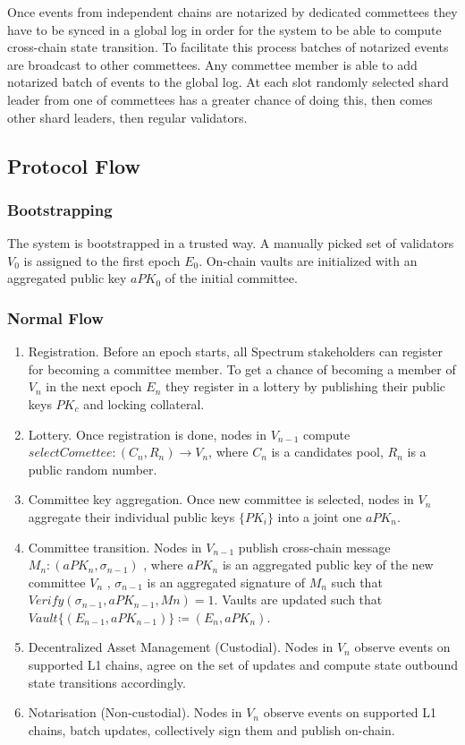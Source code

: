 Once events from independent chains are notarized by dedicated commettees they have to be synced in a global log in order for the system to be able to compute cross-chain state transition.
To facilitate this process batches of notarized events are broadcast to other commettees.
Any commettee member is able to add notarized batch of events to the global log.
At each slot randomly selected shard leader from one of commettees has a greater chance of doing this, then comes other shard leaders, then regular validators.

\subsection{Protocol Flow}\label{subsec:protocol-flow}

\subsubsection{Bootstrapping}\label{subsubsec:bootstrapping}

The system is bootstrapped in a trusted way.
A manually picked set of validators $V_0$ is assigned to the first epoch $E_0$.
On-chain vaults are initialized with an aggregated public key $aPK_0$ of the initial committee.

\subsubsection{Normal Flow}\label{subsubsec:normal-flow}

\begin{enumerate}
    \item Registration.
    Before an epoch starts, all Spectrum stakeholders can register for becoming a committee member.
    To get a chance of becoming a member of $V_n$ in the next epoch $E_n$ they register in a lottery
    by publishing their public keys $PK_c$ and locking collateral.
    \item Lottery.
    Once registration is done, nodes in $V_{n-1}$ compute ${selectComettee: (C_n, R_n) \rightarrow V_n}$,
    where  $C_n$ is a candidates pool, $R_n$ is a public random number.
    \item Committee key aggregation.
    Once new committee is selected, nodes in $V_n$ aggregate their individual public keys $\{PK_i\}$ into
    a joint one $aPK_n$.
    \item Committee transition.
    Nodes in $V_{n-1}$ publish cross-chain message ${M_n : (aPK_n, \sigma_{n-1})}$ , where $aPK_n$ is
    an aggregated public key of the new committee $V_n$ , $\sigma_{n-1}$ is an aggregated signature of
    $M_n$ such that ${Verify(\sigma_{n-1}, aPK_{n-1}, Mn) = 1}$.
    Vaults are updated such that ${Vault\{(E_{n-1}, aPK_{n-1})\} \coloneqq (E_n, aPK_n)}$.
    \item Decentralized Asset Management (Custodial).
    Nodes in $V_n$ observe events on supported L1 chains, agree on the set of updates
    and compute state outbound state transitions accordingly.
    \item Notarisation (Non-custodial).
    Nodes in $V_n$ observe events on supported L1 chains, batch updates, collectively sign them and
    publish on-chain.
\end{enumerate}